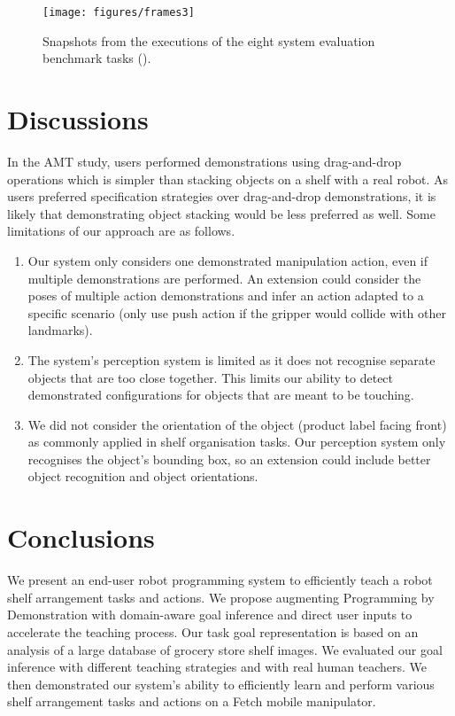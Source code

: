 \begin{figure}
	\texttt{[image: figures/frames3]}
	\caption{Snapshots from the executions of the eight system evaluation benchmark tasks ().}
	\label{fig:ppp-can}
\end{figure}


\section{Discussions}\label{sec:irosdiscussions}
In the AMT study, users performed demonstrations using drag-and-drop operations which is simpler than stacking objects on a shelf with a real robot. 
As users preferred specification strategies over drag-and-drop demonstrations, it is likely that demonstrating object stacking would be less preferred as well.
Some limitations of our approach are as follows.
\begin{enumerate}
	\item Our system only considers one demonstrated manipulation action, even if multiple demonstrations are performed. An extension could consider the poses of multiple action demonstrations and infer an action adapted to a specific scenario (\eg only use push action if the gripper would collide with other landmarks).
	\item The system's perception system is limited as it does not recognise separate objects that are too close together. This limits our ability to detect demonstrated configurations for objects that are meant to be touching.
	\item We did not consider the orientation of the object (\eg product label facing front) as commonly applied in shelf organisation tasks. Our perception system only recognises the object's bounding box, so an extension could include better object recognition and object orientations.
\end{enumerate}

\section{Conclusions}
\label{sec:irosconclusion}
We present an end-user robot programming system to efficiently teach a robot shelf arrangement tasks and actions.
We propose augmenting Programming by Demonstration with domain-aware goal inference and direct user inputs to accelerate the teaching process.
Our task goal representation is based on an analysis of a large database of grocery store shelf images.
We evaluated our goal inference with different teaching strategies and with real human teachers.
We then demonstrated our system's ability to efficiently learn and perform various shelf arrangement tasks and actions on a Fetch mobile manipulator.
